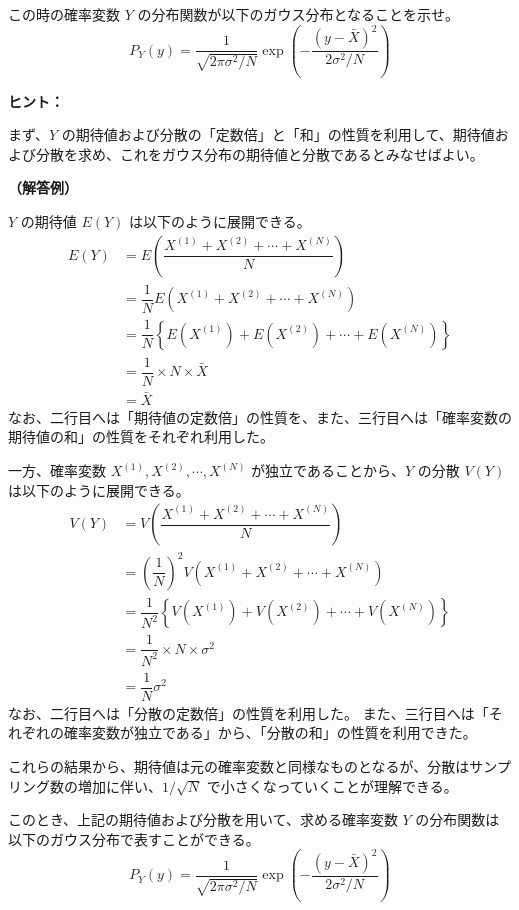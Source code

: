 \documentclass[uplatex,dvipdfmx,a4paper,11pt]{jsarticle}
\begin{document}
\begin{enumerate}
この時の確率変数 $Y$ の分布関数が以下のガウス分布となることを示せ。
\begin{equation*}
P_Y(y) = \dfrac{1}{\sqrt{2 \pi \sigma^2/N}} \exp \left(-\dfrac{(y-\bar{X})^2}{2 \sigma^2/N} \right)
\end{equation*}

\begin{itembox}[l]{{\bf ヒント：}}

まず、$Y$ の期待値および分散の「定数倍」と「和」の性質を利用して、期待値および分散を求め、これをガウス分布の期待値と分散であるとみなせばよい。

\end{itembox}

{\bf （解答例）}

$Y$ の期待値 $E(Y)$ は以下のように展開できる。
\begin{align*}
E(Y)
	&= E \left(\dfrac{X^{(1)} + X^{(2)} + \cdots + X^{(N)} }{N} \right) \\
	&= \dfrac{1}{N} E \left(X^{(1)} + X^{(2)} + \cdots + X^{(N)} \right) \\
	&= \dfrac{1}{N} \left\{ E (X^{(1)}) + E(X^{(2)}) + \cdots + E(X^{(N)}) \right\} \\
	&= \dfrac{1}{N} \times N \times \bar{X} \\
	&= \bar{X}
\end{align*}
なお、二行目へは「期待値の定数倍」の性質を、また、三行目へは「確率変数の期待値の和」の性質をそれぞれ利用した。

一方、確率変数 $X^{(1)}, X^{(2)}, \cdots, X^{(N)}$ が独立であることから、$Y$ の分散 $V(Y)$ は以下のように展開できる。
\begin{align*}
V(Y)
	&= V \left(\dfrac{X^{(1)} + X^{(2)} + \cdots + X^{(N)} }{N} \right) \\
	&= \left(\dfrac{1}{N} \right)^2 V \left(X^{(1)} + X^{(2)} + \cdots + X^{(N)} \right) \\
	&= \dfrac{1}{N^2} \left\{ V (X^{(1)}) + V(X^{(2)}) + \cdots + V(X^{(N)}) \right\} \\
	&= \dfrac{1}{N^2} \times N \times \sigma^2 \\
	&= \dfrac{1}{N} \sigma^2
\end{align*}
なお、二行目へは「分散の定数倍」の性質を利用した。
また、三行目へは「それぞれの確率変数が独立である」から、「分散の和」の性質を利用できた。



これらの結果から、期待値は元の確率変数と同様なものとなるが、分散はサンプリング数の増加に伴い、$1/\sqrt{N}$ で小さくなっていくことが理解できる。

\color{black}

このとき、上記の期待値および分散を用いて、求める確率変数 $Y$ の分布関数は以下のガウス分布で表すことができる。
\begin{equation*}
P_Y(y) = \dfrac{1}{\sqrt{2 \pi \sigma^2/N}} \exp \left(-\dfrac{(y-\bar{X})^2}{2 \sigma^2/N} \right)
\end{equation*}


\color{black}

\end{enumerate}
\end{document}
